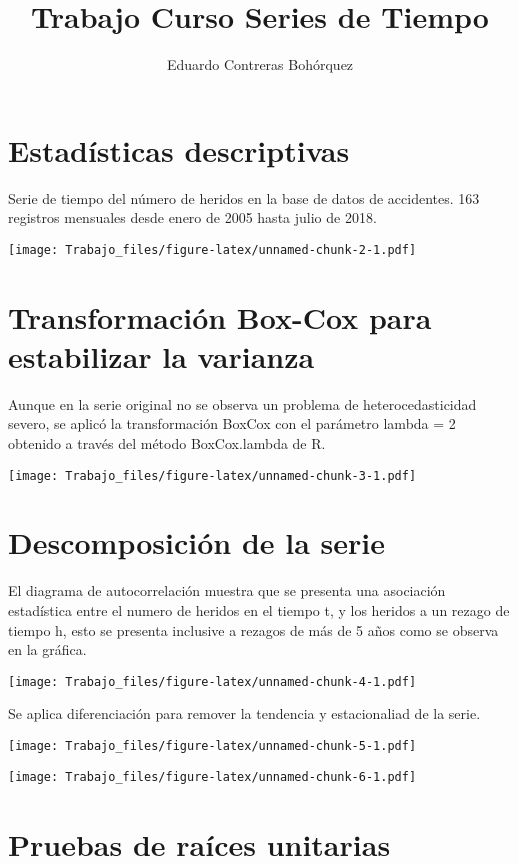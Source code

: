 \documentclass[]{article}
\title{Trabajo Curso Series de Tiempo}
\author{Eduardo Contreras Bohórquez}
\date{}
\begin{document}
\maketitle

{
\setcounter{tocdepth}{2}
\tableofcontents
}
\section{Estadísticas descriptivas}\label{estadisticas-descriptivas}

Serie de tiempo del número de heridos en la base de datos de accidentes.
163 registros mensuales desde enero de 2005 hasta julio de 2018.

\texttt{[image: Trabajo\_files/figure-latex/unnamed-chunk-2-1.pdf]}

\section{Transformación Box-Cox para estabilizar la
varianza}\label{transformacion-box-cox-para-estabilizar-la-varianza}

Aunque en la serie original no se observa un problema de
heterocedasticidad severo, se aplicó la transformación BoxCox con el
parámetro lambda = 2 obtenido a través del método BoxCox.lambda de R.

\texttt{[image: Trabajo\_files/figure-latex/unnamed-chunk-3-1.pdf]}

\section{Descomposición de la serie}\label{descomposicion-de-la-serie}

El diagrama de autocorrelación muestra que se presenta una asociación
estadística entre el numero de heridos en el tiempo t, y los heridos a
un rezago de tiempo h, esto se presenta inclusive a rezagos de más de 5
años como se observa en la gráfica.

\texttt{[image: Trabajo\_files/figure-latex/unnamed-chunk-4-1.pdf]}

Se aplica diferenciación para remover la tendencia y estacionaliad de la
serie.

\texttt{[image: Trabajo\_files/figure-latex/unnamed-chunk-5-1.pdf]}

\texttt{[image: Trabajo\_files/figure-latex/unnamed-chunk-6-1.pdf]}

\section{Pruebas de raíces unitarias}\label{pruebas-de-raices-unitarias}
\end{document}
